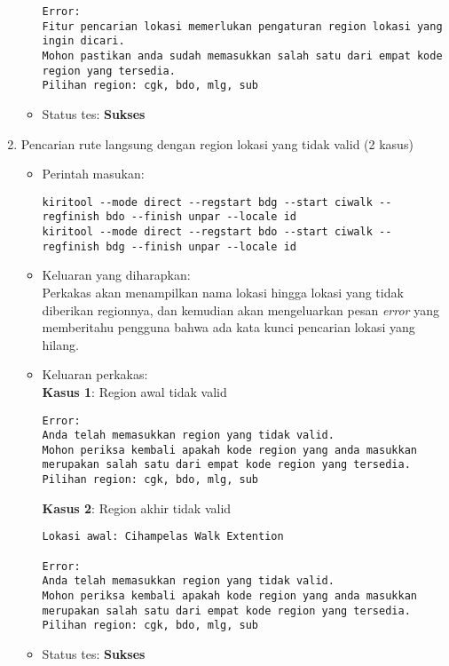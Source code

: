 \begin{enumerate}
\begin{itemize}
\begin{lstlisting}
Error:
Fitur pencarian lokasi memerlukan pengaturan region lokasi yang ingin dicari.
Mohon pastikan anda sudah memasukkan salah satu dari empat kode region yang tersedia.
Pilihan region: cgk, bdo, mlg, sub
		\end{lstlisting}
		\item Status tes: \textbf{Sukses}
	\end{itemize}
	
	\item Pencarian rute langsung dengan region lokasi yang tidak valid (2 kasus)
	\begin{itemize}
		\item Perintah masukan:
		\begin{lstlisting}
kiritool --mode direct --regstart bdg --start ciwalk --regfinish bdo --finish unpar --locale id
kiritool --mode direct --regstart bdo --start ciwalk --regfinish bdg --finish unpar --locale id
		\end{lstlisting}
		\item Keluaran yang diharapkan: \\
		Perkakas akan menampilkan nama lokasi hingga lokasi yang tidak diberikan regionnya, dan kemudian akan mengeluarkan pesan \textit{error} yang memberitahu pengguna bahwa ada kata kunci pencarian lokasi yang hilang.
		\item Keluaran perkakas: \\
		\textbf{Kasus 1}: Region awal tidak valid
		\begin{lstlisting}
Error:
Anda telah memasukkan region yang tidak valid.
Mohon periksa kembali apakah kode region yang anda masukkan merupakan salah satu dari empat kode region yang tersedia.
Pilihan region: cgk, bdo, mlg, sub
		\end{lstlisting}
		\textbf{Kasus 2}: Region akhir tidak valid
		\begin{lstlisting}
Lokasi awal: Cihampelas Walk Extention

Error:
Anda telah memasukkan region yang tidak valid.
Mohon periksa kembali apakah kode region yang anda masukkan merupakan salah satu dari empat kode region yang tersedia.
Pilihan region: cgk, bdo, mlg, sub
		\end{lstlisting}
		\item Status tes: \textbf{Sukses}
	\end{itemize}
	

\end{enumerate}
